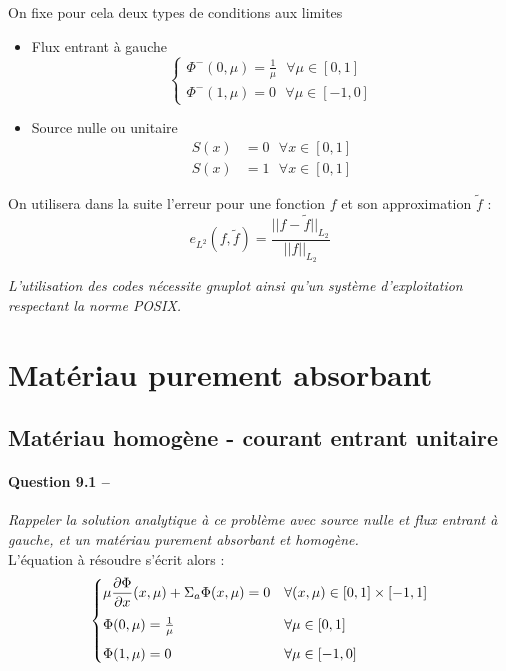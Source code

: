 \documentclass[11pt,a4paper]{article}
\newcommand{\dx}[1]{\dfrac{\partial #1}{\partial x}}
\newcommand{\norm}[1]{\big|\big|#1\big|\big|}
\newcommand{\question}[2]{\paragraph{Question #1 --}\hspace{-7pt}\textit{#2} \\}
\begin{document}
On fixe pour cela deux types de conditions aux limites 
\begin{itemize}
\item Flux entrant à gauche
  \begin{equation}
    \begin{cases}
      \Phi^{-} (0, \mu) = \frac{1}{\mu}  ~~~ \forall \mu \in [0,1]\\
      \Phi^{-} (1, \mu) = 0 ~~~ \forall \mu \in [-1,0]
    \end{cases}
  \end{equation}
\item Source nulle ou unitaire
  \begin{align}
    S(x) &= 0 ~~~ \forall x \in [0,1] \\
    S(x) &= 1 ~~~ \forall x \in [0,1] 
  \end{align}
\end{itemize}	

On utilisera dans la suite l'erreur pour une fonction $f$ et son approximation $\tilde{f}$ : 
\begin{equation}
  e_{L^2}(f, \tilde{f}) = \frac{\norm{f-\tilde{f}}_{L_2}}{\norm{f}_{L_2}}
\end{equation}

\emph{L'utilisation des codes nécessite gnuplot ainsi qu'un système d'exploitation respectant la norme POSIX.}

\section{Matériau purement absorbant}

\subsection{Matériau homogène - courant entrant unitaire}

\question{9.1}{Rappeler la solution analytique à ce problème avec source nulle et flux entrant à gauche, et un matériau purement absorbant et homogène.}

L'équation à résoudre s'écrit alors :
\begin{equation}
  \begin{cases}
    \mu \dx{\Phi}(x, \mu) + \Sigma_a \Phi(x, \mu) = 0 & \forall (x, \mu) \in [0,1]\times[-1,1]  \medskip\\ 
    \Phi(0,\mu) = \frac{1}{\mu} & \forall \mu \in [0,1] \medskip\\
    \Phi(1,\mu) = 0 & \forall \mu \in [-1,0]
  \end{cases}
  \label{eq:pasdiff}
\end{equation}
\end{document}
